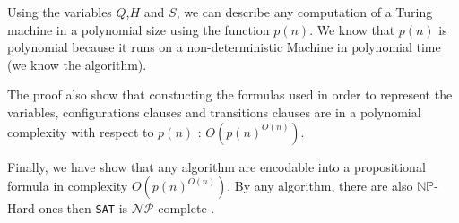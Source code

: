 \documentclass[a4paper,11pt]{report}
\newcommand*{\NPcp}{$\mathcal{NP}$-complete }
\begin{document}
Using the variables $Q$,$H$ and $S$, we can describe any computation of a Turing
machine in a polynomial size using the function $p(n)$. We know that $p(n)$ is
polynomial because it runs on a non-deterministic Machine in polynomial time (we
know the algorithm).

The proof also show that constucting the formulas used in order to represent the
variables, configurations clauses and transitions clauses are in a polynomial
complexity with respect to $p(n)$ : $O(p(n)^{O(n)})$.

Finally, we have show that any algorithm are encodable into a propositional
formula in complexity $O(p(n)^{O(n)})$. By any algorithm, there are also
$\mathbb{NP}$-Hard ones then \texttt{SAT} is \NPcp.
\end{document}

